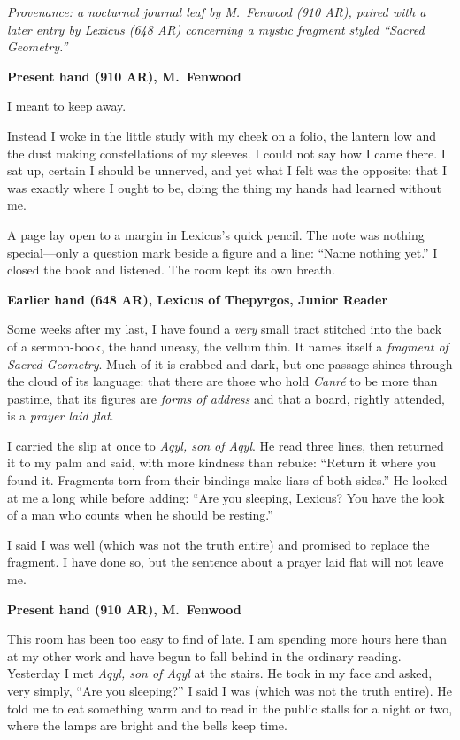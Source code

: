 \documentclass[11pt]{article}
\begin{document}
\noindent\textit{Provenance: a nocturnal journal leaf by M.\ Fenwood (910 AR), paired with a later entry by Lexicus (648 AR) concerning a mystic fragment styled ``Sacred Geometry.''}

\medskip
\noindent\textbf{Present hand (910 AR), M.\ Fenwood}

I meant to keep away.

Instead I woke in the little study with my cheek on a folio, the lantern low and the dust making constellations of my sleeves. I could not say how I came there. I sat up, certain I should be unnerved, and yet what I felt was the opposite: that I was exactly where I ought to be, doing the thing my hands had learned without me.

A page lay open to a margin in Lexicus’s quick pencil. The note was nothing special—only a question mark beside a figure and a line: ``Name nothing yet.'' I closed the book and listened. The room kept its own breath.

\medskip
\noindent\textbf{Earlier hand (648 AR), Lexicus of Thepyrgos, Junior Reader}

Some weeks after my last, I have found a \emph{very} small tract stitched into the back of a sermon-book, the hand uneasy, the vellum thin. It names itself a \textit{fragment of Sacred Geometry}. Much of it is crabbed and dark, but one passage shines through the cloud of its language: that there are those who hold \textit{Canr\'e} to be more than pastime, that its figures are \emph{forms of address} and that a board, rightly attended, is a \emph{prayer laid flat}.

I carried the slip at once to \textit{Aqyl, son of Aqyl}. He read three lines, then returned it to my palm and said, with more kindness than rebuke: ``Return it where you found it. Fragments torn from their bindings make liars of both sides.'' He looked at me a long while before adding: ``Are you sleeping, Lexicus? You have the look of a man who counts when he should be resting.''

I said I was well (which was not the truth entire) and promised to replace the fragment. I have done so, but the sentence about a prayer laid flat will not leave me.

\medskip
\noindent\textbf{Present hand (910 AR), M.\ Fenwood}

This room has been too easy to find of late. I am spending more hours here than at my other work and have begun to fall behind in the ordinary reading. Yesterday I met \textit{Aqyl, son of Aqyl} at the stairs. He took in my face and asked, very simply, ``Are you sleeping?'' I said I was (which was not the truth entire). He told me to eat something warm and to read in the public stalls for a night or two, where the lamps are bright and the bells keep time.
\end{document}
